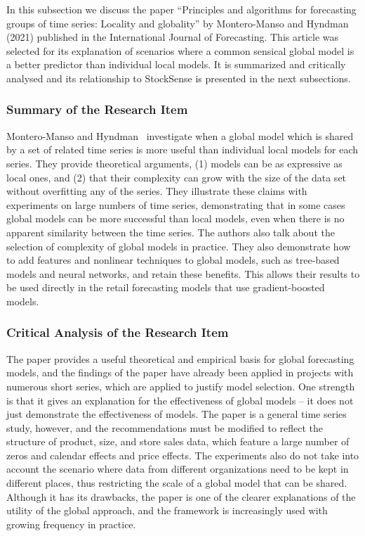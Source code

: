 \documentclass{StockSense}
\begin{document}
In this subsection we discuss the paper ``Principles and algorithms for forecasting groups of time series: Locality and globality'' by Montero-Manso and Hyndman (2021) published in the International Journal of Forecasting. This article was selected for its explanation of scenarios where a common sensical global model is a better predictor than individual local models. It is summarized and critically analysed and its relationship to StockSense is presented in the next subsections.

\subsubsection{Summary of the Research Item}

Montero-Manso and Hyndman~\cite{montero2021principles} investigate when a global model which is shared by a set of related time series is more useful than individual local models for each series. They provide theoretical arguments, (1) models can be as expressive as local ones, and (2) that their complexity can grow with the size of the data set without overfitting any of the series. They illustrate these claims with experiments on large numbers of time series, demonstrating that in some cases global models can be more successful than local models, even when there is no apparent similarity between the time series. The authors also talk about the selection of complexity of global models in practice. They also demonstrate how to add features and nonlinear techniques to global models, such as tree-based models and neural networks, and retain these benefits. This allows their results to be used directly in the retail forecasting models that use gradient-boosted models.

\subsubsection{Critical Analysis of the Research Item}

The paper provides a useful theoretical and empirical basis for global forecasting models, and the findings of the paper have already been applied in projects with numerous short series, which are applied to justify model selection. One strength is that it gives an explanation for the effectiveness of global models – it does not just demonstrate the effectiveness of models. The paper is a general time series study, however, and the recommendations must be modified to reflect the structure of product, size, and store sales data, which feature a large number of zeros and calendar effects and price effects. The experiments also do not take into account the scenario where data from different organizations need to be kept in different places, thus restricting the scale of a global model that can be shared. Although it has its drawbacks, the paper is one of the clearer explanations of the utility of the global approach, and the framework is increasingly used with growing frequency in practice.
\end{document}

